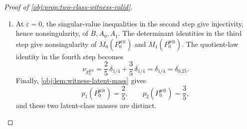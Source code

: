 \begin{proof}[Proof of \cref{obj:prop:two-class-witness-valid}]
\begin{enumerate}
\item At \(\varepsilon=0\), the singular-value inequalities in the second step give injectivity, hence
nonsingularity, of \(B,A_0,A_1\).  The determinant identities in the third step give nonsingularity of
\(M_0(P_0^{\mathrm{wit}})\) and \(M_1(P_0^{\mathrm{wit}})\).  The quotient-law identity in the fourth step becomes
\[
\nu_{P_0^{\mathrm{wit}}}
=
\frac25\,\delta_{1/4}+\frac35\,\delta_{1/4}
=
\delta_{1/4}
=
\delta_{0.25}.
\]
Finally, \cref{obj:lem:witness-latent-mass} gives
\[
p_1(P_0^{\mathrm{wit}})=\frac25,\qquad
p_2(P_0^{\mathrm{wit}})=\frac35,
\]
and these two latent-class masses are distinct. %
\end{enumerate}
\end{proof}

